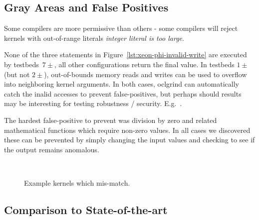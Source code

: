 \subsection{Gray Areas and False Positives}


Some compilers are more permissive than others - some compilers will reject kernels with out-of-range literals \emph{integer literal is too large}.

None of the three statements in Figure~\ref{lst:xeon-phi-invalid-write} are executed by testbeds~$7\pm$, all other configurations return the final value. In testbeds $1\pm$ (but not $2\pm$), out-of-bounds memory reads and writes can be used to overflow into neighboring kernel arguments. In both cases, oclgrind can automatically catch the inalid accesses to prevent false-positives, but perhaps should results may be interesting for testing robustness / security. E.g.~\cite{Holler2012}.

The hardest false-positive to prevent was division by zero and related mathematical functions which require non-zero values. In all cases we discovered these can be prevented by simply changing the input values and checking to see if the output remains anomalous.

\begin{figure}
  \centering %
  \\%
  \caption{Example kernels which mis-match.}%
  \label{lst:gray-areas}%
\end{figure}



\subsection{Comparison to State-of-the-art}%
\label{subsec:vs_clsmith}

